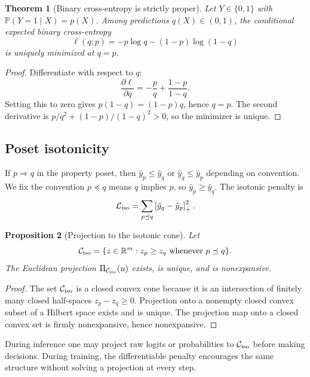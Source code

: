 \documentclass[11pt]{article}
\newtheorem{theorem}{Theorem}[section]
\newtheorem{proposition}[theorem]{Proposition}
\theoremstyle{definition}
\theoremstyle{remark}
\newcommand{\R}{\mathbb{R}}
\newcommand{\Prob}{\mathbb{P}}
\newcommand{\loss}{\mathcal{L}}
\numberwithin{equation}{section}
\begin{document}
\begin{theorem}[Binary cross-entropy is strictly proper]
Let \(Y\in\{0,1\}\) with \(\Prob(Y=1\mid X)=p(X)\).  Among predictions \(q(X)\in(0,1)\), the conditional expected binary cross-entropy
\begin{equation}
    \ell(q;p)= -p\log q-(1-p)\log(1-q)
\end{equation}
 is uniquely minimized at \(q=p\).
\end{theorem}
\begin{proof}
Differentiate with respect to \(q\):
\begin{equation}
    \frac{\partial \ell}{\partial q}= -\frac{p}{q}+\frac{1-p}{1-q}.
\end{equation}
Setting this to zero gives \(p(1-q)=(1-p)q\), hence \(q=p\).  The second derivative is \(p/q^2+(1-p)/(1-q)^2>0\), so the minimizer is unique.
\end{proof}

\subsection{Poset isotonicity}

If \(p\Rightarrow q\) in the property poset, then \(\hat y_p\le \hat y_q\) or \(\hat y_q\le\hat y_p\) depending on convention.  We fix the convention \(p\preceq q\) means \(q\) implies \(p\), so \(\hat y_p\ge \hat y_q\).  The isotonic penalty is
\begin{equation}
    \loss_{\rm iso}=\sum_{p\preceq q}\left[\hat y_q-\hat y_p\right]_+^2.
\end{equation}

\begin{proposition}[Projection to the isotonic cone]
Let
\begin{equation}
    \mathcal C_{\rm iso}=\{z\in\R^m:z_p\ge z_q\text{ whenever }p\preceq q\}.
\end{equation}
The Euclidean projection \(\Pi_{\mathcal C_{\rm iso}}(u)\) exists, is unique, and is nonexpansive.
\end{proposition}
\begin{proof}
The set \(\mathcal C_{\rm iso}\) is a closed convex cone because it is an intersection of finitely many closed half-spaces \(z_p-z_q\ge 0\).  Projection onto a nonempty closed convex subset of a Hilbert space exists and is unique.  The projection map onto a closed convex set is firmly nonexpansive, hence nonexpansive.
\end{proof}

During inference one may project raw logits or probabilities to \(\mathcal C_{\rm iso}\) before making decisions.  During training, the differentiable penalty encourages the same structure without solving a projection at every step.
\end{document}
